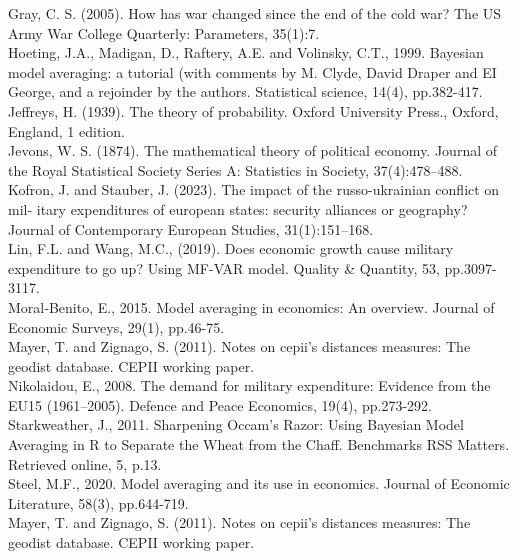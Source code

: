 \documentclass[12pt,a4paper]{article}
\begin{document}
Gray, C. S. (2005). How has war changed since the end of the cold war? The US Army War College Quarterly: Parameters, 35(1):7. \\

Hoeting, J.A., Madigan, D., Raftery, A.E. and Volinsky, C.T., 1999. Bayesian model averaging: a tutorial (with comments by M. Clyde, David Draper and EI George, and a rejoinder by the authors. Statistical science, 14(4), pp.382-417. \\

Jeffreys, H. (1939). The theory of probability. Oxford University Press., Oxford, England, 1 edition. \\

Jevons, W. S. (1874). The mathematical theory of political economy. Journal of the Royal Statistical Society Series A: Statistics in Society, 37(4):478–488. \\

Kofron, J. and Stauber, J. (2023). The impact of the russo-ukrainian conflict on mil- itary expenditures of european states: security alliances or geography? Journal of Contemporary European Studies, 31(1):151–168. \\

Lin, F.L. and Wang, M.C., (2019). Does economic growth cause military expenditure to go up? Using MF-VAR model. Quality \& Quantity, 53, pp.3097-3117. \\

Moral‐Benito, E., 2015. Model averaging in economics: An overview. Journal of Economic Surveys, 29(1), pp.46-75.\\

Mayer, T. and Zignago, S. (2011). Notes on cepii’s distances measures: The geodist database. CEPII working paper.\\

Nikolaidou, E., 2008. The demand for military expenditure: Evidence from the EU15 (1961–2005). Defence and Peace Economics, 19(4), pp.273-292.\\

Starkweather, J., 2011. Sharpening Occam’s Razor: Using Bayesian Model Averaging in R to Separate the Wheat from the Chaff. Benchmarks RSS Matters. Retrieved online, 5, p.13.\\

Steel, M.F., 2020. Model averaging and its use in economics. Journal of Economic Literature, 58(3), pp.644-719.\\

Mayer, T. and Zignago, S. (2011). Notes on cepii’s distances measures: The geodist database. CEPII working paper. \\
\end{document}
